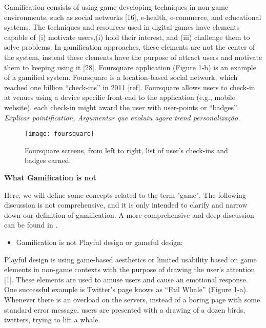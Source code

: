 
Gamification consists of using game developing techniques in
non-game environments, such as social networks [16], e-health, e-commerce, and educational systems. The techniques and resources used in digital games have elements
capable of (i) motivate users,(i) hold their interest, and (iii) challenge them
to solve problems. In gamification approaches, these elements are
not the center of the system, instead these elements have the purpose of attract users and motivate them to keeping using it [28]. Foursquare application (Figure 1-b) is an
example of a gamified system. Foursquare is a location-based
social network, which reached one billion “check-ins” in 2011 [ref].
Foursquare allows users to check-in at venues using a device specific
front-end to the application (e.g., mobile website), each
check-in might award the user with user-points or “badges”. 
\textit{Explicar pointification, 
Argumentar que evoluiu agora trend personalização.}

\begin{figure}[h!]
\caption{Foursquare screens, from left to right, list of user's check-ins and badges earned. }
\centering
\texttt{[image: foursquare]}
\label{fig:foursquere}
\end{figure}

\textbf{What Gamification is not}

Here, we will define some concepts related to the term "game". The following discussion is not comprehensive, and it is only intended to clarify and narrow down our definition of gamification. A more comprehensive and deep discussion can be found in \citeauthor{Deterding2011}.

\begin{itemize}
\item Gamification is not Playful design or gameful design:
\end{itemize}

Playful design is using game-based aesthetics or limited usability
based on game elements in non-game contexts with the purpose of
drawing the user's attention [1]. These elements are used to amuse
users and cause an emotional response. One successful example is
Twitter’s page knows as “Fail Whale” (Figure 1-a). Whenever
there is an overload on the servers, instead of a boring page with
some standard error message, users are presented with a drawing of
a dozen birds, twitters, trying to lift a whale.


